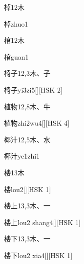 \begin{entry}{棹}{12}{⽊}
  \begin{phonetics}{棹}{zhuo1}
  \end{phonetics}
\end{entry}

\begin{entry}{棺}{12}{⽊}
  \begin{phonetics}{棺}{guan1}
  \end{phonetics}
\end{entry}

\begin{entry}{椅子}{12,3}{⽊、⼦}
  \begin{phonetics}{椅子}{yi3zi5}[][HSK 2]
  \end{phonetics}
\end{entry}

\begin{entry}{植物}{12,8}{⽊、⽜}
  \begin{phonetics}{植物}{zhi2wu4}[][HSK 4]
  \end{phonetics}
\end{entry}

\begin{entry}{椰汁}{12,5}{⽊、⽔}
  \begin{phonetics}{椰汁}{ye1zhi1}
  \end{phonetics}
\end{entry}

\begin{entry}{楼}{13}{⽊}
  \begin{phonetics}{楼}{lou2}[][HSK 1]
  \end{phonetics}
\end{entry}

\begin{entry}{楼上}{13,3}{⽊、⼀}
  \begin{phonetics}{楼上}{lou2 shang4}[][HSK 1]
  \end{phonetics}
\end{entry}

\begin{entry}{楼下}{13,3}{⽊、⼀}
  \begin{phonetics}{楼下}{lou2 xia4}[][HSK 1]
  \end{phonetics}
\end{entry}


